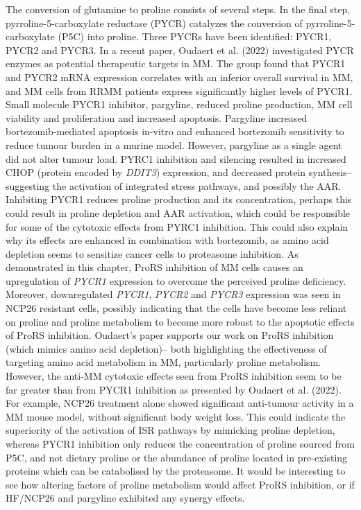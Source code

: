 The conversion of glutamine to proline consists of several steps.
In the final step, pyrroline-5-carboxylate reductase (PYCR) catalyzes the conversion of pyrroline-5-carboxylate (P5C) into proline.
Three PYCRs have been identified: PYCR1, PYCR2 and PYCR3.
In a recent paper, Oudaert et al. (2022) investigated PYCR enzymes as potential therapeutic targets in MM\cite{oudaert2022pyrroline}.
The group found that PYCR1 and PYCR2 mRNA expression correlates with an inferior overall survival in MM, and MM cells from RRMM patients express significantly higher levels of PYCR1\@.
Small molecule PYCR1 inhibitor, pargyline, reduced proline production, MM cell viability and proliferation and increased apoptosis.
Pargyline increased bortezomib-mediated apoptosis in-vitro and enhanced bortezomib sensitivity to reduce tumour burden in a murine model.
However, pargyline as a single agent did not alter tumour load.
PYRC1 inhibition and silencing resulted in increased CHOP (protein encoded by \textit{DDIT3}) expression, and decreased protein synthesis-- suggesting the activation of integrated stress pathways, and possibly the AAR.
Inhibiting PYCR1 reduces proline production and its concentration, perhaps this could result in proline depletion and AAR activation, which could be responsible for some of the cytotoxic effects from PYRC1 inhibition.
This could also explain why its effects are enhanced in combination with bortezomib, as amino acid depletion seems to sensitize cancer cells to proteasome inhibition\cite{mizrachy2010amino}.
As demonstrated in this chapter, ProRS inhibition of MM cells causes an upregulation of \textit{PYCR1} expression to overcome the perceived proline deficiency.
Moreover, downregulated \textit{PYCR1}, \textit{PYCR2} and \textit{PYCR3} expression was seen in NCP26 resistant cells, possibly indicating that the cells have become less reliant on proline and proline metabolism to become more robust to the apoptotic effects of ProRS inhibition.
Oudaert's paper supports our work on ProRS inhibition (which mimics amino acid depletion)-- both highlighting the effectiveness of targeting amino acid metabolism in MM, particularly proline metabolism.
However, the anti-MM cytotoxic effects seen from ProRS inhibition seem to be far greater than from PYCR1 inhibition as presented by Oudaert et al. (2022).
For example, NCP26 treatment alone showed significant anti-tumour activity in a MM mouse model, without significant body weight loss\cite{bottpreclinical2022}.
This could indicate the superiority of the activation of ISR pathways by mimicking proline depletion, whereas PYCR1 inhibition only reduces the concentration of proline sourced from P5C, and not dietary proline or the abundance of proline located in pre-existing proteins which can be catabolised by the proteasome.
It would be interesting to see how altering factors of proline metabolism would affect ProRS inhibition, or if HF/NCP26 and pargyline exhibited any synergy effects.


